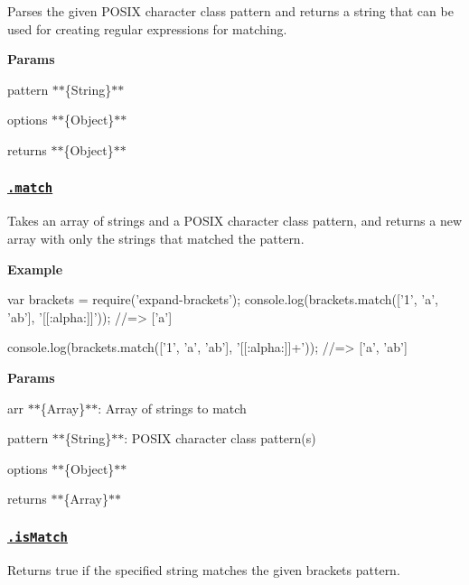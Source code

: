Parses the given P\+O\+S\+IX character class {\ttfamily pattern} and returns a string that can be used for creating regular expressions for matching.

{\bfseries Params}


\begin{DoxyItemize}
\item {\ttfamily pattern} $\ast$$\ast$\{String\}$\ast$$\ast$
\item {\ttfamily options} $\ast$$\ast$\{Object\}$\ast$$\ast$
\item {\ttfamily returns} $\ast$$\ast$\{Object\}$\ast$$\ast$
\end{DoxyItemize}

\subsubsection*{\href{index.js#L54}{\tt .match}}

Takes an array of strings and a P\+O\+S\+IX character class pattern, and returns a new array with only the strings that matched the pattern.

{\bfseries Example}


\begin{DoxyCode}
var brackets = require('expand-brackets');
console.log(brackets.match(['1', 'a', 'ab'], '[[:alpha:]]'));
//=> ['a']

console.log(brackets.match(['1', 'a', 'ab'], '[[:alpha:]]+'));
//=> ['a', 'ab']
\end{DoxyCode}


{\bfseries Params}


\begin{DoxyItemize}
\item {\ttfamily arr} $\ast$$\ast$\{Array\}$\ast$$\ast$\+: Array of strings to match
\item {\ttfamily pattern} $\ast$$\ast$\{String\}$\ast$$\ast$\+: P\+O\+S\+IX character class pattern(s)
\item {\ttfamily options} $\ast$$\ast$\{Object\}$\ast$$\ast$
\item {\ttfamily returns} $\ast$$\ast$\{Array\}$\ast$$\ast$
\end{DoxyItemize}

\subsubsection*{\href{index.js#L100}{\tt .is\+Match}}

Returns true if the specified {\ttfamily string} matches the given brackets {\ttfamily pattern}.

